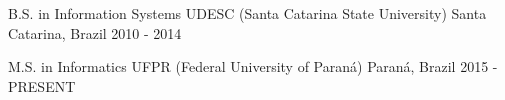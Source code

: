 

\begin{cventries}

  \cventry
    {B.S. in Information Systems} %
    {UDESC (Santa Catarina State University)} %
    {Santa Catarina, Brazil} %
    {2010 - 2014} %
    {
    }

  \cventry
	{M.S. in Informatics} %
	{UFPR (Federal University of Paraná)} %
	{Paraná, Brazil} %
	{2015 - PRESENT} %
	{
	}
	

\end{cventries}
